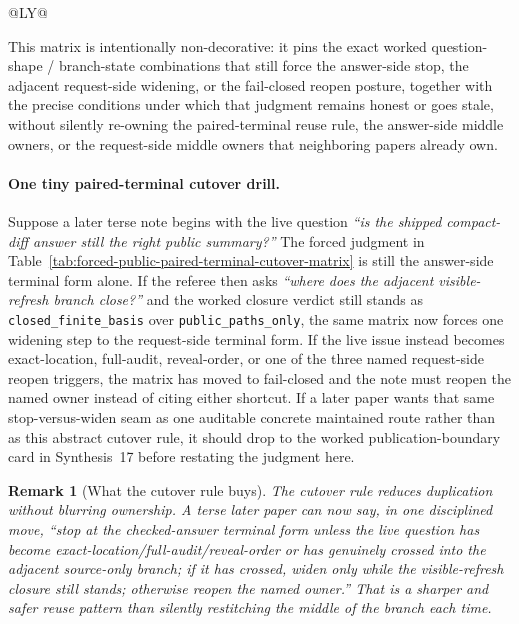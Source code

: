 \documentclass[11pt]{article}
\newtheorem{remark}{Remark}
\begin{document}
\begin{table}[t]
\begin{tabularx}{\linewidth}{@{}LY@{}}
\bottomrule
\end{tabularx}
\caption{A forced public paired-terminal cutover matrix. This is the smallest public answer later terse papers can quote directly when the live issue is whether one concrete question-shape / branch-state pair still forces the same stop, widen, or fail-closed judgment.}
\label{tab:forced-public-paired-terminal-cutover-matrix}
\end{table}

This matrix is intentionally non-decorative: it pins the exact worked question-shape / branch-state combinations that still force the answer-side stop, the adjacent request-side widening, or the fail-closed reopen posture, together with the precise conditions under which that judgment remains honest or goes stale, without silently re-owning the paired-terminal reuse rule, the answer-side middle owners, or the request-side middle owners that neighboring papers already own.\cite{series:workedexample}

\paragraph{One tiny paired-terminal cutover drill.}
Suppose a later terse note begins with the live question \emph{``is the shipped compact-diff answer still the right public summary?''} The forced judgment in Table~\ref{tab:forced-public-paired-terminal-cutover-matrix} is still the answer-side terminal form alone. If the referee then asks \emph{``where does the adjacent visible-refresh branch close?''} and the worked closure verdict still stands as \nolinkurl{closed_finite_basis} over \nolinkurl{public_paths_only}, the same matrix now forces one widening step to the request-side terminal form. If the live issue instead becomes exact-location, full-audit, reveal-order, or one of the three named request-side reopen triggers, the matrix has moved to fail-closed and the note must reopen the named owner instead of citing either shortcut. If a later paper wants that same stop-versus-widen seam as one auditable concrete maintained route rather than as this abstract cutover rule, it should drop to the worked publication-boundary card in Synthesis~17 before restating the judgment here.

\begin{remark}[What the cutover rule buys]
The cutover rule reduces duplication without blurring ownership.
A terse later paper can now say, in one disciplined move, ``stop at the checked-answer terminal form unless the live question has become exact-location/full-audit/reveal-order or has genuinely crossed into the adjacent source-only branch; if it has crossed, widen only while the visible-refresh closure still stands; otherwise reopen the named owner.''
That is a sharper and safer reuse pattern than silently restitching the middle of the branch each time.
\end{remark}
\end{document}
